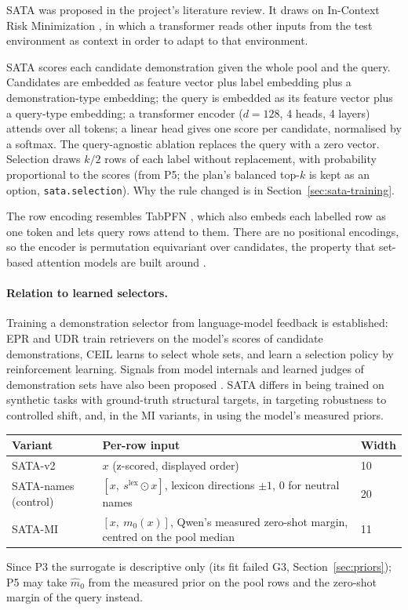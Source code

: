 \documentclass[11pt,a4paper]{article}
\newcommand{\1}{\mathbf{1}}
\theoremstyle{plain}
\theoremstyle{definition}
\theoremstyle{remark}
\begin{document}
SATA was proposed in the project's literature review. It draws on
In-Context Risk Minimization \citep{gupta2024context}, in which a
transformer reads other inputs from the test environment as context in
order to adapt to that environment.

SATA scores each candidate demonstration given the whole pool and the
query. Candidates are embedded as feature vector plus label embedding plus a
demonstration-type embedding; the query is embedded as its feature vector
plus a query-type embedding; a transformer encoder ($d = 128$, 4 heads,
4 layers) attends over all tokens; a linear head gives one score per
candidate, normalised by a softmax. The query-agnostic ablation replaces the
query with a zero vector. Selection draws $k/2$ rows of each label without
replacement, with probability proportional to the scores (from P5; the plan's
balanced top-$k$ is kept as an option, \texttt{sata.selection}). Why the rule
changed is in Section~\ref{sec:sata-training}.

The row encoding resembles TabPFN \citep{hollmann2023tabpfn}, which also
embeds each labelled row as one token and lets query rows attend to them.
There are no positional encodings, so the encoder is permutation
equivariant over candidates, the property that set-based attention models
are built around \citep{lee2019set}.

\paragraph{Relation to learned selectors.} Training a demonstration
selector from language-model feedback is established: EPR
\citep{rubin2022learning} and UDR \citep{li2023unified} train retrievers on
the model's scores of candidate demonstrations, CEIL
\citep{ye2023compositional} learns to select whole sets, and
\citet{zhang2022active} learn a selection policy by reinforcement learning.
Signals from model internals and learned judges of demonstration sets have
also been proposed \citep{kato2025affinity,wang2026disp}. SATA differs in
being trained on synthetic tasks with ground-truth structural targets, in
targeting robustness to controlled shift, and, in the MI variants, in using
the model's measured priors.

\begin{center}
\begin{tabular}{lll}
\toprule
\textbf{Variant} & \textbf{Per-row input} & \textbf{Width} \\
\midrule
SATA-v2 & $x$ (z-scored, displayed order) & 10 \\
SATA-names (control) & $[x,\ s^{\text{lex}} \odot x]$, lexicon directions $\pm 1$, 0 for neutral names & 20 \\
SATA-MI & $[x,\ m_0(x)]$, Qwen's measured zero-shot margin, centred on the pool median & 11 \\
\bottomrule
\end{tabular}
\end{center}
Since P3 the surrogate is descriptive only (its fit failed G3,
Section~\ref{sec:priors}); P5 may take $\hat m_0$ from the measured prior on
the pool rows and the zero-shot margin of the query instead.
\end{document}
